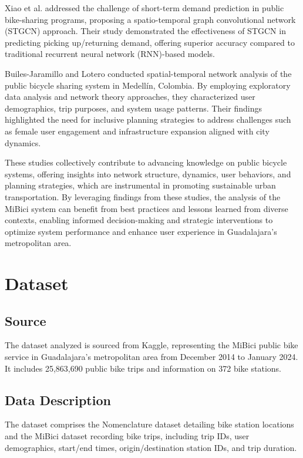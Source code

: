 \documentclass[conference]{IEEEtran}
\begin{document}
Xiao et al. \cite{xiao2021demand} addressed the challenge of short-term demand prediction in public bike-sharing programs, proposing a spatio-temporal graph convolutional network (STGCN) approach. Their study demonstrated the effectiveness of STGCN in predicting picking up/returning demand, offering superior accuracy compared to traditional recurrent neural network (RNN)-based models.

Builes-Jaramillo and Lotero \cite{builes-jaramillo2022spatial} conducted spatial-temporal network analysis of the public bicycle sharing system in Medellín, Colombia. By employing exploratory data analysis and network theory approaches, they characterized user demographics, trip purposes, and system usage patterns. Their findings highlighted the need for inclusive planning strategies to address challenges such as female user engagement and infrastructure expansion aligned with city dynamics.

These studies collectively contribute to advancing knowledge on public bicycle systems, offering insights into network structure, dynamics, user behaviors, and planning strategies, which are instrumental in promoting sustainable urban transportation. By leveraging findings from these studies, the analysis of the MiBici system can benefit from best practices and lessons learned from diverse contexts, enabling informed decision-making and strategic interventions to optimize system performance and enhance user experience in Guadalajara's metropolitan area.

\section{Dataset}

\subsection{Source}
The dataset analyzed is sourced from Kaggle, representing the MiBici public bike service in Guadalajara's metropolitan area from December 2014 to January 2024. It includes 25,863,690 public bike trips and information on 372 bike stations.

\subsection{Data Description}
The dataset comprises the Nomenclature dataset detailing bike station locations and the MiBici dataset recording bike trips, including trip IDs, user demographics, start/end times, origin/destination station IDs, and trip duration.
\end{document}
